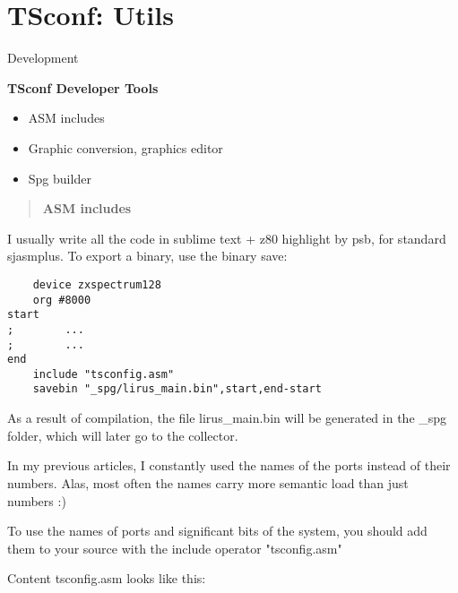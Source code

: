 \documentclass{article}
\begin{document}
\section*{TSconf: Utils}

Development

\textbf{TSconf Developer Tools}

\begin{itemize}
\item ASM includes
\item Graphic conversion, graphics editor
\item Spg builder
\end{itemize}

\begin{quotation}
  \textbf{ASM includes}
\end{quotation}
I usually write all the code in sublime text + z80 highlight by psb,
for standard sjasmplus. To export a binary, use the binary save:

\begin{verbatim}
	device zxspectrum128
	org #8000
start
;        ...
;        ...
end
	include "tsconfig.asm"
	savebin "_spg/lirus_main.bin",start,end-start
\end{verbatim}

As a result of compilation, the file lirus\_main.bin will be generated
in the \_spg folder, which will later go to the collector.

In my previous articles, I constantly used the names of the ports
instead of their numbers. Alas, most often the names carry more
semantic load than just numbers :)

To use the names of ports and significant bits of the system, you
should add them to your source with the include operator
"tsconfig.asm"

Content tsconfig.asm looks like this:
\end{document}

